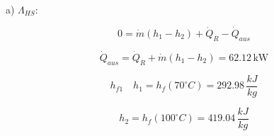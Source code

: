 a) \(\Lambda_{HS}:\)

\[
0 = \dot{m} (h_1 - h_2) + \dot{Q}_R - \dot{Q}_{aus}
\]

\[
\dot{Q}_{aus} = \dot{Q}_R + \dot{m} (h_1 - h_2) = 62.12 \, \text{kW}
\]

\[
h_{f1} \quad h_1 = h_f (70^\circ C) = 292.98 \, \frac{kJ}{kg}
\]

\[
h_2 = h_f (100^\circ C) = 419.04 \, \frac{kJ}{kg}
\]